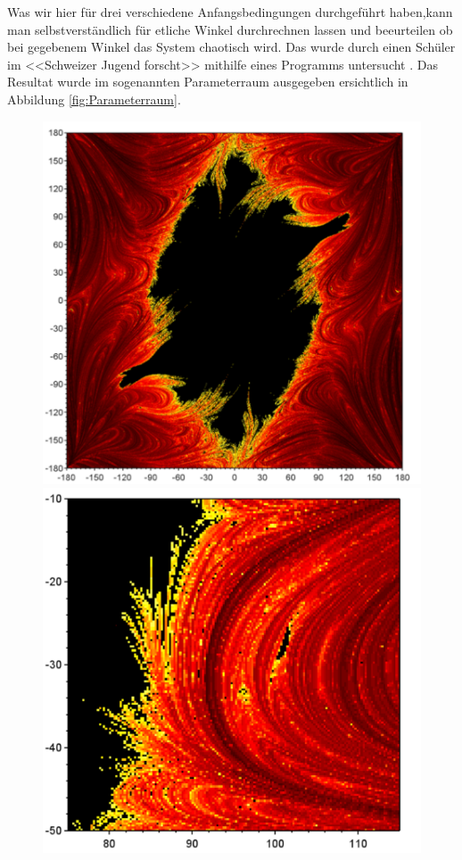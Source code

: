 Was wir hier für drei verschiedene Anfangsbedingungen durchgeführt haben,kann man selbstverständlich
für etliche Winkel durchrechnen lassen und beeurteilen ob bei gegebenem Winkel das System chaotisch wird.
Das wurde durch einen Schüler im <<Schweizer Jugend forscht>> mithilfe eines Programms untersucht
\cite{doppelpendel:wettbewerbsarbeit}.
Das Resultat wurde im sogenannten Parameterraum ausgegeben
ersichtlich in Abbildung \ref{fig:Parameterraum}.
\begin{figure}
    \centering
    \begin{minipage}{0.45\textwidth}
        \centering
        \includegraphics[width=\textwidth]{papers/doppelpendel/images/parameterraum.png}
    \end{minipage}
    \hfill
    \begin{minipage}{0.45\textwidth}
        \centering
        \includegraphics[width=\textwidth]{papers/doppelpendel/images/parameterraum_stabile_inseln.png}

\end{minipage}
\end{figure}
